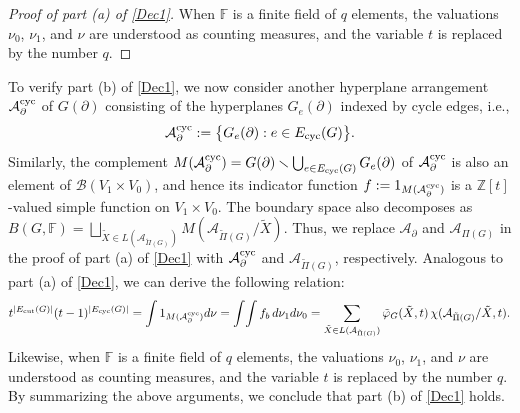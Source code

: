 \documentclass[12pt]{article}%
\renewcommand*{\bm}[1]{#1}%
\numberwithin{equation}{section}
\begin{document}
\begin{proof}[Proof of part (a) of \autoref{Dec1}]
When $\mathbb{F}$ is a finite field of $q$ elements, the valuations $\nu _0$, $\nu_1$, and $\nu$ are understood as
counting measures, and the variable $t$ is replaced by the number $q$. 
\end{proof}

To verify part (b) of \autoref{Dec1}, we now consider another hyperplane arrangement $\mathcal{A}^{\rm cyc}_\partial$ of $G(\partial)$ consisting of the hyperplanes $G_e(\partial)$ indexed by cycle edges, i.e.,
\[
\mathcal{A}^{\rm cyc}_\partial:=\big\{G_e(\partial):e\in E_{\rm cyc}(G)\big\}.
\]
Similarly, the complement $M(\mathcal{A}^{\rm cyc}_\partial)=G(\partial)\smallsetminus\bigcup_{e\in E_{\rm cyc}(G)}G_e(\partial)$ of $\mathcal{A}^{\rm cyc}_\partial$ is also an element of $\mathcal{B}(V_1\times V_0)$, and hence its indicator function $f:=1_{M(\mathcal{A}^{\rm cyc}_\partial)}$ is a $\mathbb{Z}[t]$-valued simple function on $V_1\times V_0$. The boundary space also decomposes as $B(G,\mathbb{F})=\bigsqcup_{{\tilde X}\in L(\mathcal{A}_{{\tilde\Pi}(G)})}M(\mathcal{A}_{{\tilde\Pi(G)}}/{\tilde X})$. Thus, we replace $\mathcal{A}_\partial$ and $\mathcal{A}_{\Pi(G)}$ in the proof of part (a) of \autoref{Dec1} with $\mathcal{A}^{\rm cyc}_\partial$ and $\mathcal{A}_{{\tilde\Pi(G)}}$, respectively. Analogous to part (a) of \autoref {Dec1}, we can derive the following relation:
\[
t^{|E_{\rm cut}(G)|}(t-1)^{|E_{\rm cyc}(G)|}=\int 1_{M(\mathcal{A}^{\rm cyc}_\partial)}d\nu=\int\!\int f_{\bm b}\,d\nu_1d\nu_0=\sum_{\tilde{X}\in L(\mathcal{A}_{\tilde{\Pi}(G)})}\tilde{\varphi}_G(\tilde{X},t)\,\chi(\mathcal{A}_{\tilde{\Pi}(G)}/\tilde{X},t).
\]
Likewise, when $\mathbb{F}$ is a finite field of $q$ elements, the valuations $\nu _0$, $\nu_1$, and $\nu$ are understood as
counting measures, and the variable $t$ is replaced by the number $q$. By summarizing the above arguments, we conclude that part (b) of \autoref{Dec1} holds.
\end{document}
